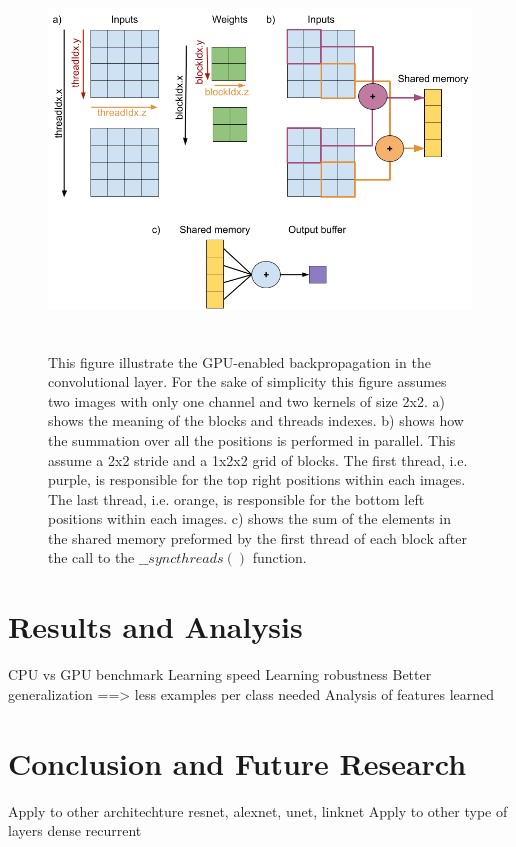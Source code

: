 \documentclass[11pt]{report}
\begin{document}
\begin{figure}[h]
\centering
\includegraphics[width=13cm, height=10cm]{conv2d_backpropagation}
\caption{This figure illustrate the GPU-enabled backpropagation in the convolutional layer. For the sake of simplicity this figure assumes two images with only one channel and two kernels of size 2x2. a) shows the meaning of the blocks and threads indexes. b) shows how the summation over all the positions is performed in parallel. This assume a 2x2 stride and a 1x2x2 grid of blocks. The first thread, i.e. purple, is responsible for the top right positions within each images. The last thread, i.e. orange, is responsible for the bottom left positions within each images. c) shows the sum of the elements in the shared memory preformed by the first thread of each block after the call to the $\_\_syncthreads()$ function.}
\label{fig:conv2d_backpropagation}
\end{figure}

\chapter{Results and Analysis} \label{result_and_analysis}

CPU vs GPU benchmark
Learning speed
Learning robustness
Better generalization ==> less examples per class needed
Analysis of features learned

\chapter{Conclusion and Future Research} \label{conclusion}


Apply to other architechture resnet, alexnet, unet, linknet
Apply to other type of layers dense recurrent

\printbibliography
\end{document}

